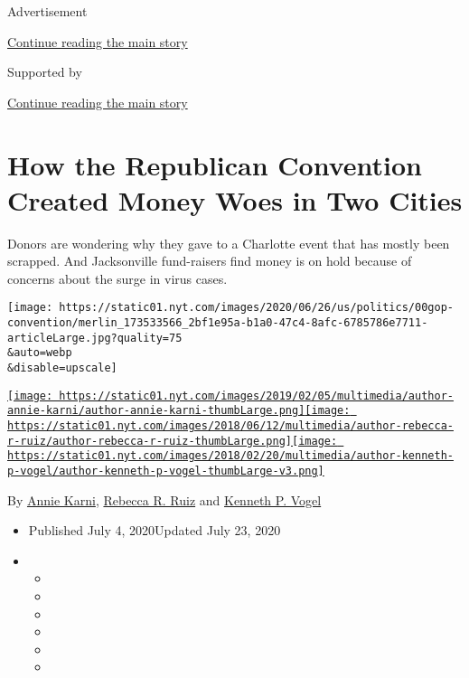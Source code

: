 Advertisement

\protect\hyperlink{after-top}{Continue reading the main story}

Supported by

\protect\hyperlink{after-sponsor}{Continue reading the main story}

\hypertarget{how-the-republican-convention-created-money-woes-in-two-cities}{%
\section{How the Republican Convention Created Money Woes in Two
Cities}\label{how-the-republican-convention-created-money-woes-in-two-cities}}

Donors are wondering why they gave to a Charlotte event that has mostly
been scrapped. And Jacksonville fund-raisers find money is on hold
because of concerns about the surge in virus cases.

\texttt{[image: https://static01.nyt.com/images/2020/06/26/us/politics/00gop-convention/merlin\_173533566\_2bf1e95a-b1a0-47c4-8afc-6785786e7711-articleLarge.jpg?quality=75\\\&auto=webp\\\&disable=upscale]}

\href{https://www.nytimes.com/by/annie-karni}{\texttt{[image: https://static01.nyt.com/images/2019/02/05/multimedia/author-annie-karni/author-annie-karni-thumbLarge.png]}}\href{https://www.nytimes.com/by/rebecca-r-ruiz}{\texttt{[image: https://static01.nyt.com/images/2018/06/12/multimedia/author-rebecca-r-ruiz/author-rebecca-r-ruiz-thumbLarge.png]}}\href{https://www.nytimes.com/by/kenneth-p-vogel}{\texttt{[image: https://static01.nyt.com/images/2018/02/20/multimedia/author-kenneth-p-vogel/author-kenneth-p-vogel-thumbLarge-v3.png]}}

By \href{https://www.nytimes.com/by/annie-karni}{Annie Karni},
\href{https://www.nytimes.com/by/rebecca-r-ruiz}{Rebecca R. Ruiz} and
\href{https://www.nytimes.com/by/kenneth-p-vogel}{Kenneth P. Vogel}

\begin{itemize}
\item
  Published July 4, 2020Updated July 23, 2020
\item
  \begin{itemize}
  \item
  \item
  \item
  \item
  \item
  \item
  \end{itemize}
\end{itemize}

